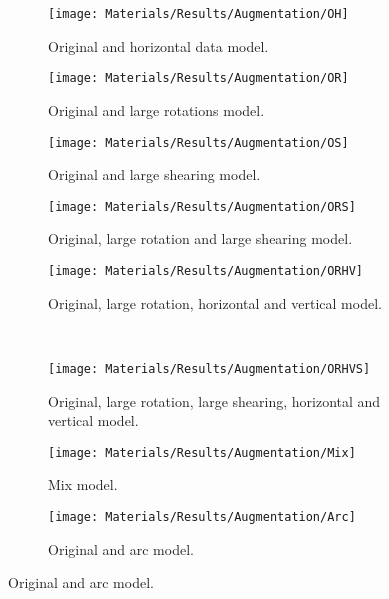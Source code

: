 \begin{figure}[H]
	\centering
	\begin{subfigure}[b]{0.19\linewidth}
		\centering
		\texttt{[image: Materials/Results/Augmentation/OH]}
		\caption{Original and horizontal data model.\\}
	\end{subfigure}
	\hfill
	\begin{subfigure}[b]{0.19\linewidth}
		\centering
		\texttt{[image: Materials/Results/Augmentation/OR]}
		\caption{Original and large rotations model.\\}
	\end{subfigure}
	\hfill
	\begin{subfigure}[b]{0.19\linewidth}
		\centering
		\texttt{[image: Materials/Results/Augmentation/OS]}
		\caption{Original and large shearing model.\\}
	\end{subfigure}
	\hfill
	\begin{subfigure}[b]{0.19\linewidth}
		\centering
		\texttt{[image: Materials/Results/Augmentation/ORS]}
		\caption{Original, large rotation and large shearing model.}
	\end{subfigure}
	\hfill
	\begin{subfigure}[b]{0.19\linewidth}
		\centering
		\texttt{[image: Materials/Results/Augmentation/ORHV]}
		\caption{Original, large rotation, horizontal and vertical model.}
	\end{subfigure}
	\\
	\begin{subfigure}[b]{0.19\linewidth}
		\centering
		\texttt{[image: Materials/Results/Augmentation/ORHVS]}
		\caption{Original, large rotation, large shearing, horizontal and vertical model.}
	\end{subfigure}
	\hfill
	\begin{subfigure}[b]{0.19\linewidth}
		\centering
		\texttt{[image: Materials/Results/Augmentation/Mix]}
		\caption{Mix model.\newline\newline\newline}
	\end{subfigure}
	\hfill
	\begin{subfigure}[b]{0.19\linewidth}
		\centering
		\texttt{[image: Materials/Results/Augmentation/Arc]}
		\caption{Original and arc model.\newline\newline}

\end{subfigure}
\end{figure}
